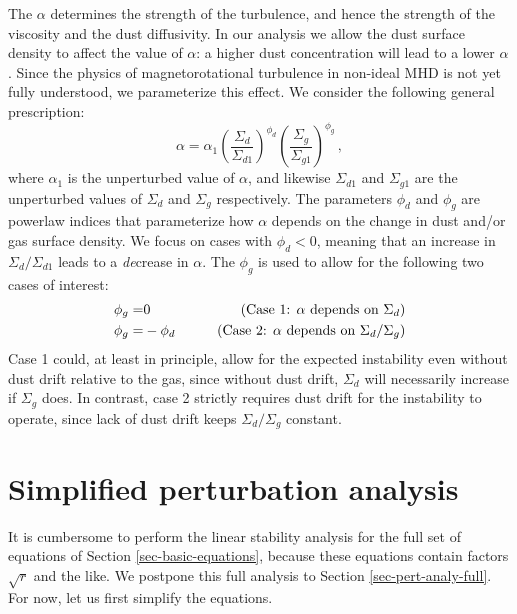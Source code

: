 \documentclass{aa}
\def\comma{\,,}
\newcommand{\revised}[1]{{#1}}
\begin{document}
The $\alpha$ determines the strength of the turbulence, and hence the strength
of the viscosity and the dust diffusivity. In our analysis we allow the dust
surface density to affect the value of $\alpha$: a higher dust concentration
will lead to a lower $\alpha$ \citep[e.g.][]{2000ApJ...543..486S, 2006A&A...445..205I, 2009ApJ...698.1122O,
  2013ApJ...765..114D}. Since the \revised{physics of magnetorotational
  turbulence in non-ideal MHD is not yet fully understood},
we parameterize this effect. We consider the following
general prescription:
\begin{equation}\label{eq-alpha-param}
  \alpha = \alpha_1\left(\frac{\Sigma_d}{\Sigma_{d1}}\right)^{\phi_d}
  \left(\frac{\Sigma_g}{\Sigma_{g1}}\right)^{\phi_g}\comma
\end{equation}
where $\alpha_1$ is the unperturbed value of $\alpha$, and likewise
$\Sigma_{d1}$ and $\Sigma_{g1}$ are the unperturbed values of $\Sigma_d$ and
$\Sigma_g$ respectively.  The parameters $\phi_d$ and $\phi_g$ are powerlaw
indices that parameterize how $\alpha$ depends on the change in dust and/or gas
surface density. We focus on cases with $\phi_d<0$, meaning that an increase
in $\Sigma_d/\Sigma_{d1}$ leads to a {\em de}crease in $\alpha$. The $\phi_g$
is used to allow for the following two cases of interest:
\begin{eqnarray}
\phi_g =& 0 & \qquad \hbox{(Case 1: $\alpha$ depends on $\Sigma_d$)} \label{eq-case-1}\\
\phi_g =& -\phi_d & \qquad \hbox{(Case 2: $\alpha$ depends on $\Sigma_d/\Sigma_g$)} \label{eq-case-2}
\end{eqnarray}
Case 1 could, at least in principle, allow for the expected instability even
without dust drift relative to the gas, since without dust drift, $\Sigma_d$
will necessarily increase if $\Sigma_g$ does. In contrast, case 2 strictly
requires dust drift for the instability to operate, since lack of dust drift
keeps $\Sigma_d/\Sigma_g$ constant.



\section{Simplified perturbation analysis}
\label{sec-pert-analy-simple}
%
It is cumbersome to perform the linear stability analysis for the full set of
equations of Section \ref{sec-basic-equations}, because these equations contain
factors $\sqrt{r}$ and the like. We postpone this full analysis to Section
\ref{sec-pert-analy-full}. For now, let us first simplify the equations.
\end{document}

